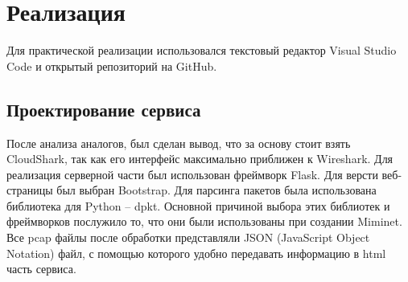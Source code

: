 % 


% 





\section{Реализация}
Для практической реализации использовался текстовый редактор Visual Studio Code и открытый репозиторий на GitHub.

\subsection{Проектирование сервиса} 
После анализа аналогов, был сделан вывод, что за основу стоит взять CloudShark, так как его интерфейс максимально приближен к Wireshark.
Для реализация серверной части был использован фреймворк Flask.
Для версти веб-страницы был выбран Bootstrap.
Для парсинга пакетов была использована библиотека для Python -- dpkt.
Основной причиной выбора этих библиотек и фреймворков послужило то, что они были использованы при создании Miminet.
Все pcap файлы после обработки представляли JSON (JavaScript Object
Notation) файл, с помощью которого удобно передавать информацию в html часть сервиса.

